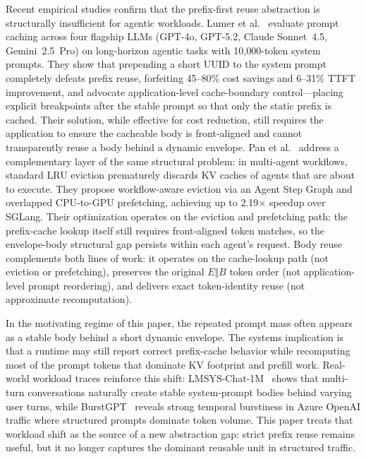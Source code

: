 \documentclass[conference]{IEEEtran}
\begin{document}
Recent empirical studies confirm that the prefix-first reuse abstraction is structurally insufficient for agentic workloads. Lumer et al.~\cite{lumer2026dontbreak} evaluate prompt caching across four flagship LLMs (GPT-4o, GPT-5.2, Claude Sonnet~4.5, Gemini~2.5~Pro) on long-horizon agentic tasks with 10{,}000-token system prompts. They show that prepending a short UUID to the system prompt completely defeats prefix reuse, forfeiting 45--80\% cost savings and 6--31\% TTFT improvement, and advocate application-level cache-boundary control---placing explicit breakpoints after the stable prompt so that only the static prefix is cached. Their solution, while effective for cost reduction, still requires the application to ensure the cacheable body is front-aligned and cannot transparently reuse a body behind a dynamic envelope. Pan et al.~\cite{pan2025kvflow} address a complementary layer of the same structural problem: in multi-agent workflows, standard LRU eviction prematurely discards KV caches of agents that are about to execute. They propose workflow-aware eviction via an Agent Step Graph and overlapped CPU-to-GPU prefetching, achieving up to 2.19$\times$ speedup over SGLang. Their optimization operates on the eviction and prefetching path; the prefix-cache lookup itself still requires front-aligned token matches, so the envelope-body structural gap persists within each agent's request. Body reuse complements both lines of work: it operates on the cache-lookup path (not eviction or prefetching), preserves the original $E \Vert B$ token order (not application-level prompt reordering), and delivers exact token-identity reuse (not approximate recomputation).

In the motivating regime of this paper, the repeated prompt mass often appears as a stable body behind a short dynamic envelope. The systems implication is that a runtime may still report correct prefix-cache behavior while recomputing most of the prompt tokens that dominate KV footprint and prefill work. Real-world workload traces reinforce this shift: LMSYS-Chat-1M~\cite{zheng2023lmsys} shows that multi-turn conversations naturally create stable system-prompt bodies behind varying user turns, while BurstGPT~\cite{chen2024burstgpt} reveals strong temporal burstiness in Azure OpenAI traffic where structured prompts dominate token volume. This paper treats that workload shift as the source of a new abstraction gap: strict prefix reuse remains useful, but it no longer captures the dominant reusable unit in structured traffic.
\end{document}
